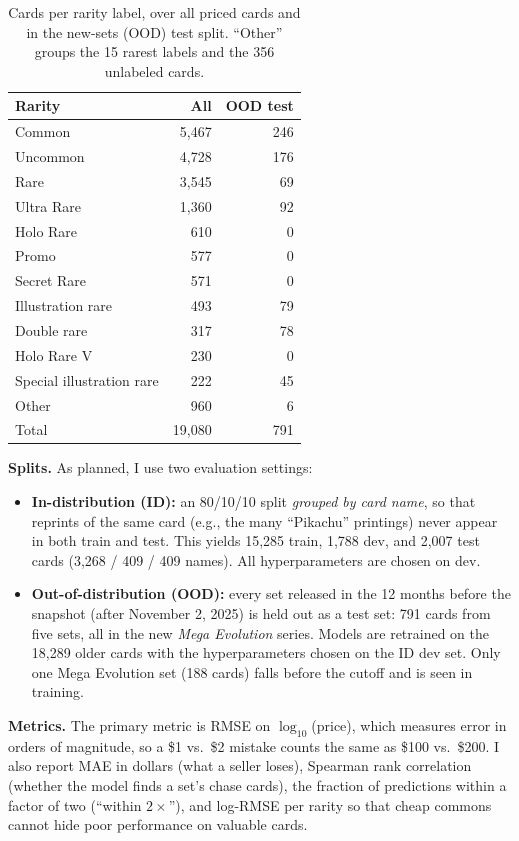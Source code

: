 \documentclass{article}
\begin{document}
\begin{table}[t]
\caption{Cards per rarity label, over all priced cards and in the new-sets (OOD) test split. ``Other'' groups the 15 rarest labels and the 356 unlabeled cards.}
\label{tab:rarity}
\vskip 0.05in
\centering
\small
\begin{tabular}{lrr}
\toprule
Rarity & All & OOD test \\
\midrule
Common & 5{,}467 & 246 \\
Uncommon & 4{,}728 & 176 \\
Rare & 3{,}545 & 69 \\
Ultra Rare & 1{,}360 & 92 \\
Holo Rare & 610 & 0 \\
Promo & 577 & 0 \\
Secret Rare & 571 & 0 \\
Illustration rare & 493 & 79 \\
Double rare & 317 & 78 \\
Holo Rare V & 230 & 0 \\
Special illustration rare & 222 & 45 \\
Other & 960 & 6 \\
\midrule
Total & 19{,}080 & 791 \\
\bottomrule
\end{tabular}
\end{table}

\textbf{Splits.} As planned, I use two evaluation settings:
\begin{itemize}
    \item \textbf{In-distribution (ID):} an 80/10/10 split \emph{grouped by card name}, so that reprints of the same card (e.g., the many ``Pikachu'' printings) never appear in both train and test. This yields 15{,}285 train, 1{,}788 dev, and 2{,}007 test cards (3{,}268 / 409 / 409 names). All hyperparameters are chosen on dev.
    \item \textbf{Out-of-distribution (OOD):} every set released in the 12 months before the snapshot (after November 2, 2025) is held out as a test set: 791 cards from five sets, all in the new \emph{Mega Evolution} series. Models are retrained on the 18{,}289 older cards with the hyperparameters chosen on the ID dev set. Only one Mega Evolution set (188 cards) falls before the cutoff and is seen in training.
\end{itemize}

\textbf{Metrics.} The primary metric is RMSE on $\log_{10}$(price), which measures error in orders of magnitude, so a \$1 vs.\ \$2 mistake counts the same as \$100 vs.\ \$200. I also report MAE in dollars (what a seller loses), Spearman rank correlation (whether the model finds a set's chase cards), the fraction of predictions within a factor of two (``within $2\times$''), and log-RMSE per rarity so that cheap commons cannot hide poor performance on valuable cards.
\end{document}
